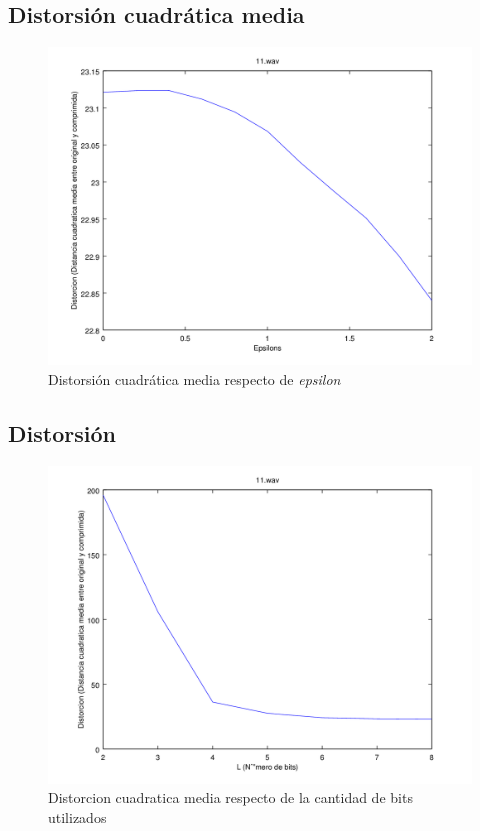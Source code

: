 \documentclass[spanish]{scrartcl}
\begin{document}
\pagebreak

\subsection{Distorsión cuadrática media}

\begin{figure}[!htbp]
    \centering
    \includegraphics[interpolate=false, scale=0.65]{plots/11_epsi_distortion}
    \caption{Distorsión cuadrática media respecto de \textit{epsilon}}
    \label{fig:dist_epsi}
\end{figure}

\pagebreak

\subsection{Distorsión}

\begin{figure}[!htbp]
    \centering
    \includegraphics[interpolate=false, scale=0.65]{plots/11_bits_distortion}
    \caption{Distorcion cuadratica media respecto de la cantidad de bits utilizados}
    \label{fig:dist_bit}
\end{figure}
\end{document}
